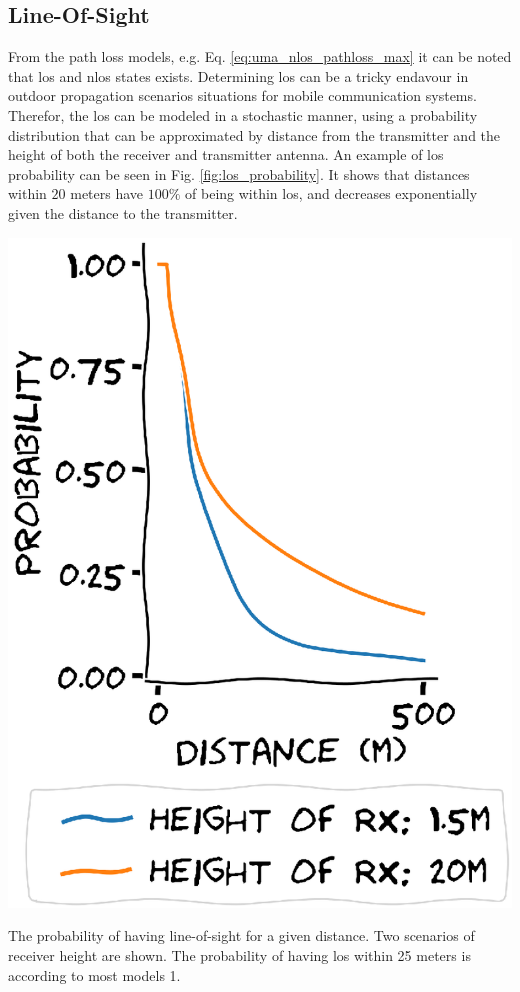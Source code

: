 
\subsection{Line-Of-Sight}
From the path loss models, e.g. Eq. \ref{eq:uma_nlos_pathloss_max} it can be noted that \gls{los} and \gls{nlos} states exists. Determining \gls{los} can be a tricky endavour in outdoor propagation scenarios situations for mobile communication systems. Therefor, the \gls{los} can be modeled in a stochastic manner, using a probability distribution that can be approximated by distance from the transmitter and the height of both the receiver and transmitter antenna. An example of \gls{los} probability can be seen in Fig. \ref{fig:los_probability}. It shows that distances within $20$ meters have $100\%$ of being within \gls{los}, and decreases exponentially given the distance to the transmitter. 

\begin{marginfigure}
\includegraphics[]{chapters/part_pathloss/figures/LOS_probability.eps}
\caption{The probability of having line-of-sight for a given distance. Two scenarios of receiver height are shown. The probability of having \gls{los} within 25 meters is according to most models 1. }\label{fig:los_probability}
\end{marginfigure}



